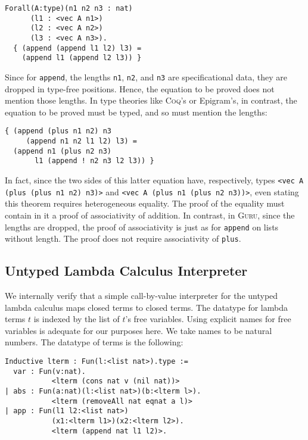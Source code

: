 \documentclass[9pt,natbib]{sigplanconf}
\newcommand{\guru}[0]{\textsc{Guru}}
\begin{document}
{\begin{verbatim}
Forall(A:type)(n1 n2 n3 : nat)
      (l1 : <vec A n1>)
      (l2 : <vec A n2>)
      (l3 : <vec A n3>).
  { (append (append l1 l2) l3) =
    (append l1 (append l2 l3)) }
\end{verbatim}}

\noindent Since for \texttt{append}, the lengths
\texttt{n1}, \texttt{n2}, and \texttt{n3} are specificational data,
they are dropped in type-free positions.  Hence, the equation to be
proved does not mention those lengths.  In type theories like \textsc{Coq}'s or
Epigram's, in contrast, the equation to be proved must be typed, and
so must mention the lengths:

{\begin{verbatim}
{ (append (plus n1 n2) n3
     (append n1 n2 l1 l2) l3) =
  (append n1 (plus n2 n3)
       l1 (append ! n2 n3 l2 l3)) }
\end{verbatim}}

\noindent In fact, since the two sides of this latter equation have,
respectively, types \texttt{<vec A (plus (plus n1 n2) n3)>} and
\texttt{<vec A (plus n1 (plus n2 n3))>}, even stating this theorem
requires heterogeneous equality.  The proof of the equality must
contain in it a proof of associativity of addition.  In contrast, in
\guru, since the lengths are dropped, the proof of associativity is
just as for \texttt{append} on lists without length.  The proof does
not require associativity of \texttt{plus}.

\subsection{Untyped Lambda Calculus Interpreter} 

We internally verify that a simple call-by-value interpreter for the
untyped lambda calculus maps closed terms to closed terms.  The
datatype for lambda terms $t$ is indexed by the list of $t$'s free
variables.  Using explicit names for free variables is adequate for
our purposes here.  We take names to be natural numbers.  The datatype
of terms is the following:

\begin{verbatim}
Inductive lterm : Fun(l:<list nat>).type :=
  var : Fun(v:nat).
           <lterm (cons nat v (nil nat))>
| abs : Fun(a:nat)(l:<list nat>)(b:<lterm l>).
           <lterm (removeAll nat eqnat a l)>
| app : Fun(l1 l2:<list nat>)
           (x1:<lterm l1>)(x2:<lterm l2>).
           <lterm (append nat l1 l2)>.
\end{verbatim}
\end{document}
